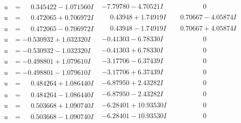 \documentclass[1p]{elsarticle_modified}
\theoremstyle{definition}
\begin{document}
$$\begin{array}{c|c|c}
\begin{aligned}
u &= \phantom{-}0.345422 - 1.071560 I\end{aligned}
 & -7.79780 - 4.70521 I & \phantom{-0.000000 } 0 \\ \hline\begin{aligned}
u &= \phantom{-}0.472065 + 0.706972 I\end{aligned}
 & \phantom{-}0.43948 + 1.74919 I & \phantom{-}0.70667 - 4.05874 I \\ \hline\begin{aligned}
u &= \phantom{-}0.472065 - 0.706972 I\end{aligned}
 & \phantom{-}0.43948 - 1.74919 I & \phantom{-}0.70667 + 4.05874 I \\ \hline\begin{aligned}
u &= -0.530932 + 1.032320 I\end{aligned}
 & -0.41303 - 6.78330 I & \phantom{-0.000000 } 0 \\ \hline\begin{aligned}
u &= -0.530932 - 1.032320 I\end{aligned}
 & -0.41303 + 6.78330 I & \phantom{-0.000000 } 0 \\ \hline\begin{aligned}
u &= -0.498801 + 1.079610 I\end{aligned}
 & -3.17706 - 6.37439 I & \phantom{-0.000000 } 0 \\ \hline\begin{aligned}
u &= -0.498801 - 1.079610 I\end{aligned}
 & -3.17706 + 6.37439 I & \phantom{-0.000000 } 0 \\ \hline\begin{aligned}
u &= \phantom{-}0.484264 + 1.086440 I\end{aligned}
 & -6.87950 + 2.43282 I & \phantom{-0.000000 } 0 \\ \hline\begin{aligned}
u &= \phantom{-}0.484264 - 1.086440 I\end{aligned}
 & -6.87950 - 2.43282 I & \phantom{-0.000000 } 0 \\ \hline\begin{aligned}
u &= \phantom{-}0.503668 + 1.090740 I\end{aligned}
 & -6.28401 + 10.93530 I & \phantom{-0.000000 } 0 \\ \hline\begin{aligned}
u &= \phantom{-}0.503668 - 1.090740 I\end{aligned}
 & -6.28401 - 10.93530 I & \phantom{-0.000000 } 0 \\ \hline\begin{aligned}

\end{aligned}
\end{array}$$
\end{document}
